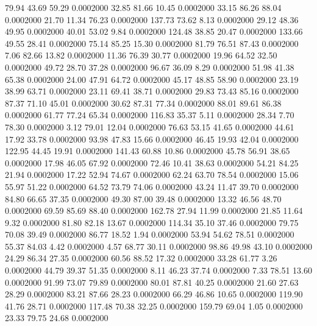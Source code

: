   79.94   43.69   59.29   0.0002000
  32.85   81.66   10.45   0.0002000
  33.15   86.26   88.04   0.0002000
  21.70   11.34   76.23   0.0002000
 137.73   73.62    8.13   0.0002000
  29.12   48.36   49.95   0.0002000
  40.01   53.02    9.84   0.0002000
 124.48   38.85   20.47   0.0002000
 133.66   49.55   28.41   0.0002000
  75.14   85.25   15.30   0.0002000
  81.79   76.51   87.43   0.0002000
   7.06   82.66   13.82   0.0002000
  11.36   76.39   30.77   0.0002000
  19.96   64.52   32.50   0.0002000
  49.72   28.70   37.28   0.0002000
  96.67   36.09    8.29   0.0002000
  51.98   41.38   65.38   0.0002000
  24.00   47.91   64.72   0.0002000
  45.17   48.85   58.90   0.0002000
  23.19   38.99   63.71   0.0002000
  23.11   69.41   38.71   0.0002000
  29.83   73.43   85.16   0.0002000
  87.37   71.10   45.01   0.0002000
  30.62   87.31   77.34   0.0002000
  88.01   89.61   86.38   0.0002000
  61.77   77.24   65.34   0.0002000
 116.83   35.37    5.11   0.0002000
  28.34    7.70   78.30   0.0002000
   3.12   79.01   12.04   0.0002000
  76.63   53.15   41.65   0.0002000
  44.61   17.92   33.78   0.0002000
  93.98   47.83   15.66   0.0002000
  46.45   19.93   42.04   0.0002000
 122.95   44.45   19.91   0.0002000
 141.43   60.88   10.86   0.0002000
  45.78   56.91   38.65   0.0002000
  17.98   46.05   67.92   0.0002000
  72.46   10.41   38.63   0.0002000
  54.21   84.25   21.94   0.0002000
  17.22   52.94   74.67   0.0002000
  62.24   63.70   78.54   0.0002000
  15.06   55.97   51.22   0.0002000
  64.52   73.79   74.06   0.0002000
  43.24   11.47   39.70   0.0002000
  84.80   66.65   37.35   0.0002000
  49.30   87.00   39.48   0.0002000
  13.32   46.56   48.70   0.0002000
  69.59   85.69   88.40   0.0002000
 162.78   27.94   11.99   0.0002000
  21.85   11.64    9.32   0.0002000
  81.80   82.18   13.67   0.0002000
 114.34   35.10   37.46   0.0002000
  79.75   70.08   39.49   0.0002000
  86.77   18.52    1.94   0.0002000
  53.94   54.62   78.51   0.0002000
  55.37   84.03    4.42   0.0002000
   4.57   68.77   30.11   0.0002000
  98.86   49.98   43.10   0.0002000
  24.29   86.34   27.35   0.0002000
  60.56   88.52   17.32   0.0002000
  33.28   61.77    3.26   0.0002000
  44.79   39.37   51.35   0.0002000
   8.11   46.23   37.74   0.0002000
   7.33   78.51   13.60   0.0002000
  91.99   73.07   79.89   0.0002000
  80.01   87.81   40.25   0.0002000
  21.60   27.63   28.29   0.0002000
  83.21   87.66   28.23   0.0002000
  66.29   46.86   10.65   0.0002000
 119.90   41.76   28.71   0.0002000
 117.48   70.38   32.25   0.0002000
 159.79   69.04    1.05   0.0002000
  23.33   79.75   24.68   0.0002000

